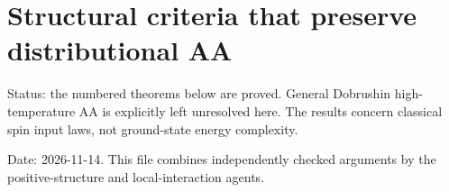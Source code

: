 \section{Structural criteria that preserve distributional
AA}\label{proof:positive_structure}

Status: the numbered theorems below are proved. General Dobrushin
high-temperature AA is explicitly left unresolved here. The results
concern classical spin input laws, not ground-state energy complexity.

Date: 2026-11-14. This file combines independently checked arguments by
the positive-structure and local-interaction agents.








